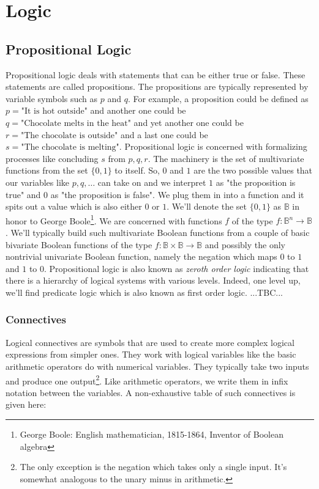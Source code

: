 \chapter{Logic}


\section{Propositional Logic}
Propositional logic deals with statements that can be either true or false. These statements are called propositions. The propositions are typically represented by variable symbols such as $p$ and $q$. For example, a proposition could be defined as $p = \text{"It is hot outside"}$ and another one could be $q = \text{"Chocolate melts in the heat"}$ and yet another one could be $r = \text{"The chocolate is outside"}$ and a last one could be $s = \text{"The chocolate is melting"}$. Propositional logic is concerned with formalizing processes like concluding $s$ from $p,q,r$. The machinery is the set of multivariate functions from the set $\{0,1\}$ to itself. So, $0$ and $1$ are the two possible values that our variables like $p,q,\ldots$ can take on and we interpret $1$ as "the proposition is true" and $0$ as "the proposition is false". We plug them in into a function and it spits out a value which is also either $0$ or $1$. We'll denote the set $\{0,1\}$ as $\mathbb{B}$ in honor to George Boole\footnote{George Boole: English mathematician, 1815-1864, Inventor of Boolean algebra}. We are concerned with functions $f$ of the type $f: \mathbb{B}^n \rightarrow \mathbb{B}$. We'll typically build such multivariate Boolean functions from a couple of basic bivariate Boolean functions of the type $f: \mathbb{B} \times \mathbb{B} \rightarrow \mathbb{B}$ and possibly the only nontrivial univariate Boolean function, namely the negation which maps $0$ to $1$ and $1$ to $0$. Propositional logic is also known as \emph{zeroth order logic} indicating that there is a hierarchy of logical systems with various levels. Indeed, one level up, we'll find predicate logic which is also known as first order logic. ...TBC...



\subsection{Connectives}
Logical connectives are symbols that are used to create more complex logical expressions from simpler ones. They work with logical variables like the basic arithmetic operators do with numerical variables. They typically take two inputs and produce one output\footnote{The only exception is the negation which takes only a single input. It's somewhat analogous to the unary minus in arithmetic.}. Like arithmetic operators, we write them in infix notation between the variables. A non-exhaustive table of such connectives is given here:

